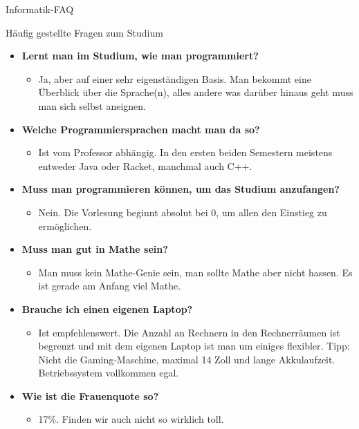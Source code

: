 \begin{Huge}
	Informatik-FAQ
\end{Huge}
\begin{block}{Häufig gestellte Fragen zum Studium}
\begin{large}
\begin{itemize}
		\item \textbf{Lernt man im Studium, wie man programmiert?}
		\begin{itemize}
			\item Ja, aber auf einer sehr eigenständigen Basis. Man bekommt eine Überblick über die Sprache(n), alles andere was darüber hinaus geht muss man sich selbst aneignen.
		\end{itemize}
	
		\item \textbf{Welche Programmiersprachen macht man da so?}
		\begin{itemize}
			\item Ist vom Professor abhängig. In den ersten beiden Semestern meistens entweder Java oder Racket, manchmal auch C++.
		\end{itemize}

		\item \textbf{Muss man programmieren können, um das Studium anzufangen?}
		\begin{itemize}
			\item Nein. Die Vorlesung beginnt absolut bei 0, um allen den Einstieg zu ermöglichen.
		\end{itemize}

	
		\item \textbf{Muss man gut in Mathe sein?}
		\begin{itemize}
			\item Man muss kein Mathe-Genie sein, man sollte Mathe aber nicht hassen. Es ist gerade am Anfang viel Mathe.
		\end{itemize}
	

		\item \textbf{Brauche ich einen eigenen Laptop?}
		\begin{itemize}
			\item Ist empfehlenswert. Die Anzahl an Rechnern in den Rechnerräumen ist begrenzt und mit dem eigenen Laptop ist man um einiges flexibler. Tipp: Nicht die Gaming-Maschine, maximal 14 Zoll und lange Akkulaufzeit. Betriebssystem vollkommen egal.
		\end{itemize}

	

		\item \textbf{Wie ist die Frauenquote so?}
		\begin{itemize}
			\item 17\%. Finden wir auch nicht so wirklich toll.
		\end{itemize}


\end{itemize}
\end{large}
\end{block}
